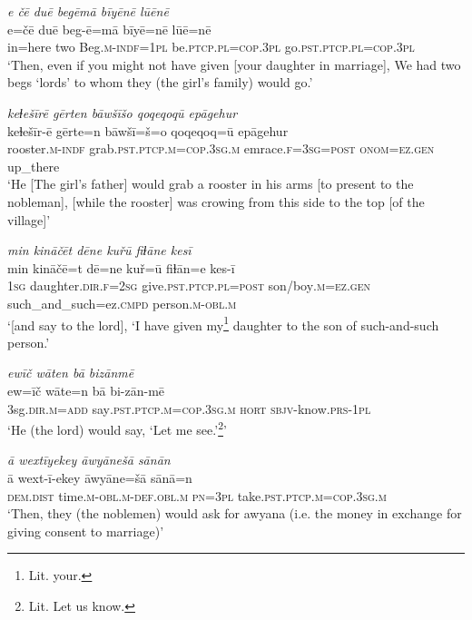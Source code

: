 \ea \label{RE.43}
\textit{e čē duē begēmā bīyēnē lūēnē} \\ 
\gll e=čē duē beg-ē=mā bīyē=nē lūē=nē \\ 
 in=here two Beg\textsc{.m}\textsc{-indf}\textsc{=\textsc{1pl}} be\textsc{.ptcp}\textsc{.pl}\textsc{=cop}\textsc{.3pl} go\textsc{.pst}\textsc{.ptcp}\textsc{.pl}\textsc{=cop}\textsc{.3pl} \\ 
\glt `Then, even if you might not have given [your daughter in marriage], We had two begs ‘lords’ to whom they (the girl's family) would go.'
\z 
 
\ea \label{RE.48}
\textit{keɫešīrē gērten bāwšīšo qoqeqoqū epāgehur} \\ 
\gll keɫešīr-ē gērte=n bāwšī=š=o qoqeqoq=ū epāgehur \\ 
 rooster\textsc{.m}\textsc{-indf} grab\textsc{.pst}\textsc{.ptcp}\textsc{.m}\textsc{=cop}\textsc{.3sg}\textsc{.m} emrace\textsc{.f}\textsc{=3sg}\textsc{=\textsc{post}} \textsc{onom}\textsc{=ez.gen} up\_there \\ 
\glt `He [The girl’s father] would grab a rooster in his arms [to present to the nobleman], [while the rooster] was crowing from this side to the top [of the village]'
\z 
 
\ea \label{RE.49}
\textit{min kināčēt dēne kuřū fiɫāne kesī} \\ 
\gll min kināčē=t dē=ne kuř=ū fiɫān=e kes-ī \\ 
 \textsc{1sg} daughter\textsc{.dir}\textsc{.f}\textsc{=\textsc{2sg}} give\textsc{.pst}\textsc{.ptcp}\textsc{.pl}\textsc{=\textsc{post}} son/boy\textsc{.m}\textsc{=ez.gen} such\_and\_such=ez\textsc{.cmpd} person\textsc{.m}\textsc{-obl}\textsc{.m} \\ 
\glt `[and say to the lord], ‘I have given my\footnote{Lit. your.} daughter to the son of such-and-such person.'
\z 
 
\ea \label{RE.51}
\textit{ewīč wāten bā bizānmē} \\ 
\gll ew=īč wāte=n bā bi-zān-mē \\ 
 3sg\textsc{.dir}\textsc{.m}\textsc{=add} say\textsc{.pst}\textsc{.ptcp}\textsc{.m}\textsc{=cop}\textsc{.3sg}\textsc{.m} \textsc{hort} \textsc{sbjv-}know\textsc{.prs}\textsc{-\textsc{1pl}} \\ 
\glt `He (the lord) would say, ‘Let me see.’\footnote{Lit. Let us know.}'
\z 
 
\ea \label{RE.58}
\textit{ā wextīyekey āwyānešā sānān} \\ 
\gll ā wext-ī-ekey āwyāne=šā sānā=n \\ 
 \textsc{dem.dist} time\textsc{.m}\textsc{-obl}\textsc{.m}\textsc{-def}\textsc{.obl}\textsc{.m} \textsc{pn}\textsc{=3pl} take\textsc{.pst}\textsc{.ptcp}\textsc{.m}\textsc{=cop}\textsc{.3sg}\textsc{.m} \\ 
\glt `Then, they (the noblemen) would ask for awyana (i.e. the money in exchange for giving consent to marriage)'
\z 
 
